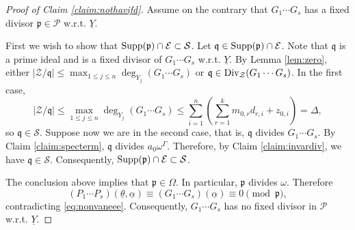 \documentclass[11pt,a4paper,reqno]{amsart}
\theoremstyle{definition}
\newtheorem{defn}[thm]{Definition}
\begin{document}
\begin{proof}[Proof of Claim \ref{claim:nothavifd}]
Assume on the contrary that $G_1\cdots G_s$ has a fixed divisor $\mathfrak{p} \in \mathcal{P}$ \hbox{w.r.t.} ${\underline Y}$. 

First we wish to show that ${\rm Supp}(\mathfrak{p}) \cap \mathcal{E} \subset \mathcal{S}$. Let $\mathfrak{q} \in {\rm Supp}(\mathfrak{p}) \cap \mathcal{E}$. Note that $\mathfrak{q}$ is a prime ideal and is a fixed divisor of $G_1\cdots G_s$ \hbox{w.r.t.} $\underline Y$. By Lemma \ref{lem:zero}, either $|\mathcal{Z}/\mathfrak{q}| \leq \max_{1 \leq j \leq n} \deg_{Y_j}(G_1\cdots G_s)$ or $\mathfrak{q} \in {\rm Div}_{\mathcal{Z}}(G_1 \cdots G_s)$. In the first case, 
$$|\mathcal{Z}/\mathfrak{q}| \leq \max_{1 \leq j \leq n} \deg_{Y_j}(G_1\cdots G_s) \leq \sum_{i=1}^n\left(\sum_{r=1}^k m_{0,r} d_{r,i}+z_{0,i}\right)=\Delta,$$
so $\mathfrak{q} \in \mathcal{S}$. Suppose now we are in the second case, that is, $\mathfrak{q}$ divides $G_1 \cdots G_s$. By Claim \ref{claim:specterm}, $\mathfrak{q}$ divides $a_0 \omega^\Gamma$. Therefore, by Claim \ref{claim:invardiv}, we have $\mathfrak{q} \in \mathcal{S}$. Consequently, ${\rm Supp}(\mathfrak{p}) \cap \mathcal{E} \subset \mathcal{S}$. 

The conclusion above implies that $\mathfrak{p} \in \Omega$. In particular, $\mathfrak{p}$ divides $\omega$. Therefore
$$
(P_1\cdots P_s)(\underline{\theta},\underline{\alpha}) \equiv (G_1\cdots G_s)(\underline{\alpha}) \equiv 0 \pmod{\mathfrak{p}},
$$
contradicting \eqref{eq:nonvaneee}. Consequently, $G_1 \cdots G_s$ has no fixed divisor in $\mathcal{P}$ w.r.t. $\underline{Y}$.
\end{proof}

%
\end{document}
